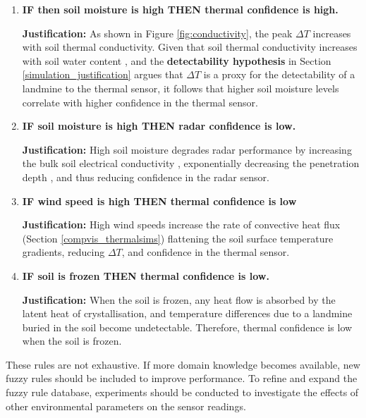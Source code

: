         \begin{enumerate}

        
            \item \textbf{IF then soil moisture is high THEN thermal confidence is high.}

                \textbf{Justification:} As shown in Figure \ref{fig:conductivity}, the peak \(\Delta T\) increases with soil thermal conductivity. Given that soil thermal conductivity increases with soil water content \cite{wu2025soil}, and the \textbf{detectability hypothesis} in Section \ref{simulation_justification} argues that \(\Delta T\) is a proxy for the detectability of a landmine to the thermal sensor, it follows that higher soil moisture levels correlate with higher confidence in the thermal sensor.
            
            \item \textbf{IF soil moisture is high THEN radar confidence is low.}

                \textbf{Justification:} High soil moisture degrades radar performance by increasing the bulk soil electrical conductivity \cite{bai2013soils}, exponentially decreasing the penetration  depth \cite{giovanni2008penetration}, and thus reducing confidence in the radar sensor.

            \item \textbf{IF wind speed is high THEN thermal confidence is low}

                \textbf{Justification:} High wind speeds increase the rate of convective heat flux (Section \ref{compvis_thermalsims}) flattening the soil surface temperature gradients, reducing \(\Delta T\), and confidence in the thermal sensor.

            \item \textbf{IF soil is frozen THEN thermal confidence is low.}

                \textbf{Justification:} When the soil is frozen, any heat flow is absorbed by the latent heat of crystallisation, and temperature differences due to a landmine buried in the soil become undetectable. Therefore, thermal confidence is low when the soil is frozen.
 
        \end{enumerate}
        

        These rules are not exhaustive. If more domain knowledge becomes available, new fuzzy rules should be included to improve performance. To refine and expand the fuzzy rule database, experiments should be conducted to investigate the effects of other environmental parameters on the sensor readings.

